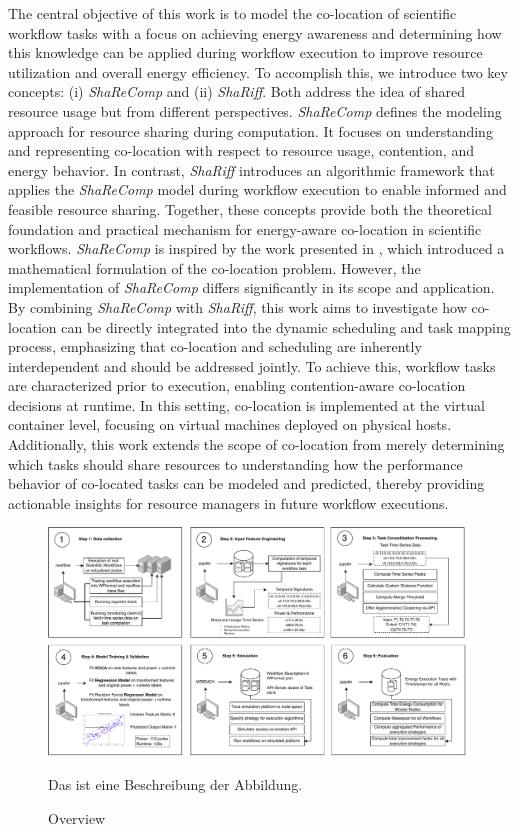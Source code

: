 The central objective of this work is to model the co-location of scientific workflow tasks with a focus on achieving energy awareness and determining how this knowledge can be applied during workflow execution to improve resource utilization and overall energy efficiency. To accomplish this, we introduce two key concepts: (i) \textit{ShaReComp} and (ii) \textit{ShaRiff}. Both address the idea of shared resource usage but from different perspectives. \textit{ShaReComp} defines the modeling approach for resource sharing during computation. It focuses on understanding and representing co-location with respect to resource usage, contention, and energy behavior. In contrast, \textit{ShaRiff} introduces an algorithmic framework that applies the \textit{ShaReComp} model during workflow execution to enable informed and feasible resource sharing. Together, these concepts provide both the theoretical foundation and practical mechanism for energy-aware co-location in scientific workflows.
\textit{ShaReComp} is inspired by the work presented in \cite{5644899}, which introduced a mathematical formulation of the co-location problem. However, the implementation of \textit{ShaReComp} differs significantly in its scope and application. By combining \textit{ShaReComp} with \textit{ShaRiff}, this work aims to investigate how co-location can be directly integrated into the dynamic scheduling and task mapping process, emphasizing that co-location and scheduling are inherently interdependent and should be addressed jointly. To achieve this, workflow tasks are characterized prior to execution, enabling contention-aware co-location decisions at runtime. In this setting, co-location is implemented at the virtual container level, focusing on virtual machines deployed on physical hosts. Additionally, this work extends the scope of co-location from merely determining which tasks should share resources to understanding how the performance behavior of co-located tasks can be modeled and predicted, thereby providing actionable insights for resource managers in future workflow executions.

\begin{figure}[H]
    \centering
    \includegraphics[scale=0.45]{fig/04/04-overview.pdf}
    \caption{Overview}
    \label{fig:04-overwiew}
    \tiny
    Das ist eine Beschreibung der Abbildung.
\end{figure}

